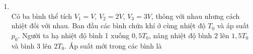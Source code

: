 \begin{enumerate}[label=\bfseries Câu \arabic*:, leftmargin=1.7cm]
\item {}\\
Có ba bình thể tích $V_1=V$, $V_2=2V$, $V_3=3V$, thông với nhau nhưng cách nhiệt đối với nhau. Ban đầu các bình chứa khí ở cùng nhiệt độ $T_0$ và áp suất $p_0$. Người ta hạ nhiệt độ bình 1 xuống $0,5T_0$, nâng nhiệt độ bình 2 lên $1,5T_0$ và bình 3 lên $2T_0$. Áp suất mới trong các bình là


\end{enumerate}

